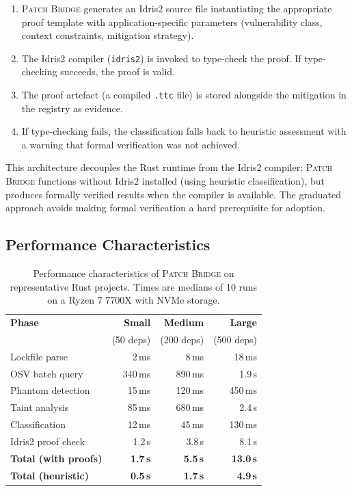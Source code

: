 \documentclass[11pt,twocolumn]{article}
\begin{document}
\begin{enumerate}[nosep]
  \item \textsc{Patch Bridge} generates an Idris2 source file
    instantiating the appropriate proof template with
    application-specific parameters (vulnerability class, context
    constraints, mitigation strategy).
  \item The Idris2 compiler (\texttt{idris2}) is invoked to type-check
    the proof. If type-checking succeeds, the proof is valid.
  \item The proof artefact (a compiled \texttt{.ttc} file) is stored
    alongside the mitigation in the registry as evidence.
  \item If type-checking fails, the classification falls back to
    heuristic assessment with a warning that formal verification was
    not achieved.
\end{enumerate}

This architecture decouples the Rust runtime from the Idris2 compiler:
\textsc{Patch Bridge} functions without Idris2 installed (using
heuristic classification), but produces formally verified results when
the compiler is available. The graduated approach avoids making formal
verification a hard prerequisite for adoption.

\subsection{Performance Characteristics}

\begin{table}[t]
\centering
\caption{Performance characteristics of \textsc{Patch Bridge} on
representative Rust projects. Times are medians of 10 runs on a
Ryzen 7 7700X with NVMe storage.}
\label{tab:performance}
\begin{tabular}{@{}lrrr@{}}
\toprule
\textbf{Phase} & \textbf{Small} & \textbf{Medium} & \textbf{Large} \\
& (50 deps) & (200 deps) & (500 deps) \\
\midrule
Lockfile parse & 2\,ms & 8\,ms & 18\,ms \\
OSV batch query & 340\,ms & 890\,ms & 1.9\,s \\
Phantom detection & 15\,ms & 120\,ms & 450\,ms \\
Taint analysis & 85\,ms & 680\,ms & 2.4\,s \\
Classification & 12\,ms & 45\,ms & 130\,ms \\
Idris2 proof check & 1.2\,s & 3.8\,s & 8.1\,s \\
\midrule
\textbf{Total (with proofs)} & \textbf{1.7\,s} & \textbf{5.5\,s} & \textbf{13.0\,s} \\
\textbf{Total (heuristic)} & \textbf{0.5\,s} & \textbf{1.7\,s} & \textbf{4.9\,s} \\
\bottomrule
\end{tabular}
\end{table}
\end{document}
